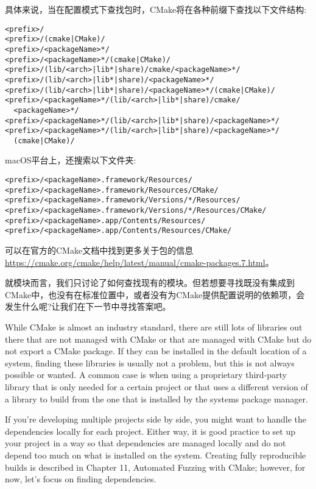 具体来说，当在配置模式下查找包时，CMake将在各种前缀下查找以下文件结构:

\begin{lstlisting}[style=styleCMake]
<prefix>/
<prefix>/(cmake|CMake)/
<prefix>/<packageName>*/
<prefix>/<packageName>*/(cmake|CMake)/
<prefix>/(lib/<arch>|lib*|share)/cmake/<packageName>*/
<prefix>/(lib/<arch>|lib*|share)/<packageName>*/
<prefix>/(lib/<arch>|lib*|share)/<packageName>*/(cmake|CMake)/
<prefix>/<packageName>*/(lib/<arch>|lib*|share)/cmake/
  <packageName>*/
<prefix>/<packageName>*/(lib/<arch>|lib*|share)/<packageName>*/
<prefix>/<packageName>*/(lib/<arch>|lib*|share)/<packageName>*/
  (cmake|CMake)/
\end{lstlisting}

macOS平台上，还搜索以下文件夹:

\begin{lstlisting}[style=styleCMake]
<prefix>/<packageName>.framework/Resources/
<prefix>/<packageName>.framework/Resources/CMake/
<prefix>/<packageName>.framework/Versions/*/Resources/
<prefix>/<packageName>.framework/Versions/*/Resources/CMake/
<prefix>/<packageName>.app/Contents/Resources/
<prefix>/<packageName>.app/Contents/Resources/CMake/
\end{lstlisting}

可以在官方的CMake文档中找到更多关于包的信息\url{https://cmake.org/cmake/help/latest/manual/cmake-packages.7.html}。

就模块而言，我们只讨论了如何查找现有的模块。但若想要寻找既没有集成到CMake中，也没有在标准位置中，或者没有为CMake提供配置说明的依赖项，会发生什么呢?让我们在下一节中寻找答案吧。


While CMake is almost an industry standard, there are still lots of libraries out there that are not managed with CMake or that are managed with CMake but do not export a CMake package. If they can be installed in the default location of a system, finding these libraries is usually not a problem, but this is not always possible or wanted. A common case is when using a proprietary third-party library that is only needed for a certain project or that uses a different version of a library to build from the one that is installed by the systems package manager.

If you're developing multiple projects side by side, you might want to handle the dependencies locally for each project. Either way, it is good practice to set up your project in a way so that dependencies are managed locally and do not depend too much on what is installed on the system. Creating fully reproducible builds is described in Chapter 11, Automated Fuzzing with CMake; however, for now, let's focus on finding dependencies. 

